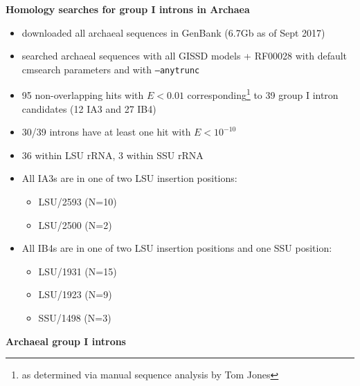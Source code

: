 \documentclass[landscape]{slides}
\begin{document}
\begin{slide}
\begin{center}
\textbf{Homology searches for group I introns in Archaea}
\end{center}
%
\small
\begin{itemize}
\item downloaded all archaeal sequences in GenBank (6.7Gb as of Sept
  2017)
\item searched archaeal sequences with all GISSD models + RF00028 with
  default cmsearch parameters and with \texttt{--anytrunc}
\item 95 non-overlapping hits with $E < 0.01$
  corresponding\footnote{as determined via manual sequence analysis by Tom Jones} to 39
  group I intron candidates (12 IA3 and 27 IB4)
\item 30/39 introns have at least one hit with $E < 10^{-10}$ 
\item 36 within LSU rRNA, 3 within SSU rRNA
\item All IA3s are in one of two LSU insertion positions:
  \begin{itemize}
  \item LSU/2593 (N=10)
  \item LSU/2500 (N=2)
  \end{itemize}
\item All IB4s are in one of two LSU insertion positions and one SSU
  position:
  \begin{itemize}
  \item LSU/1931 (N=15)
  \item LSU/1923 (N=9)
  \item SSU/1498 (N=3)
  \end{itemize}  
\end{itemize}  

\vfill
\end{slide}
\begin{slide}
\begin{center}
\textbf{Archaeal group I introns}
\end{center}


\vfill
\end{slide}
\end{document}
